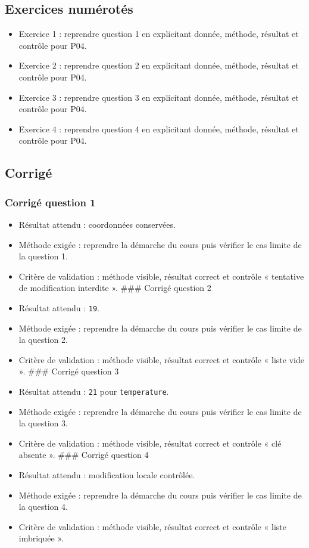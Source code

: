 \subsection{Exercices numérotés}

\begin{itemize}
\tightlist
\item
  Exercice 1 : reprendre question 1 en explicitant donnée, méthode,
  résultat et contrôle pour P04.
\item
  Exercice 2 : reprendre question 2 en explicitant donnée, méthode,
  résultat et contrôle pour P04.
\item
  Exercice 3 : reprendre question 3 en explicitant donnée, méthode,
  résultat et contrôle pour P04.
\item
  Exercice 4 : reprendre question 4 en explicitant donnée, méthode,
  résultat et contrôle pour P04.
\end{itemize}

\subsection{Corrigé}

\subsubsection{Corrigé question 1}

\begin{itemize}
\tightlist
\item
  Résultat attendu : coordonnées conservées.
\item
  Méthode exigée : reprendre la démarche du cours puis vérifier le cas
  limite de la question 1.
\item
  Critère de validation : méthode visible, résultat correct et contrôle
  « tentative de modification interdite ». \#\#\# Corrigé question 2
\item
  Résultat attendu : \texttt{19}.
\item
  Méthode exigée : reprendre la démarche du cours puis vérifier le cas
  limite de la question 2.
\item
  Critère de validation : méthode visible, résultat correct et contrôle
  « liste vide ». \#\#\# Corrigé question 3
\item
  Résultat attendu : \texttt{21} pour \texttt{temperature}.
\item
  Méthode exigée : reprendre la démarche du cours puis vérifier le cas
  limite de la question 3.
\item
  Critère de validation : méthode visible, résultat correct et contrôle
  « clé absente ». \#\#\# Corrigé question 4
\item
  Résultat attendu : modification locale contrôlée.
\item
  Méthode exigée : reprendre la démarche du cours puis vérifier le cas
  limite de la question 4.
\item
  Critère de validation : méthode visible, résultat correct et contrôle
  « liste imbriquée ».
\end{itemize}


